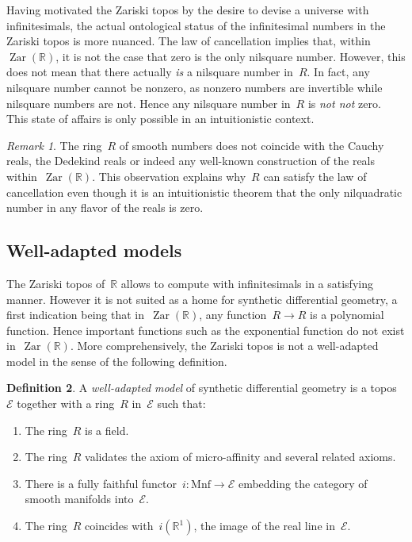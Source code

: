 \documentclass[oneside,reqno]{amsart}
\theoremstyle{definition}
\newtheorem{defn}{Definition}[section]
\theoremstyle{plain}
\theoremstyle{remark}
\newtheorem{rem}[defn]{Remark}
\newcommand{\E}{\mathcal{E}}
\newcommand{\RR}{\mathbb{R}}
\DeclareMathOperator{\Zar}{Zar}
\renewcommand{\_}{\mathpunct{.}\,}
\newcommand{\?}{\,{:}\,}
\begin{document}
Having motivated the Zariski topos by the desire to devise a universe with
infinitesimals, the actual ontological status of the infinitesimal numbers in
the Zariski topos is more nuanced. The law of cancellation implies that,
within~$\Zar(\RR)$, it is not the case that zero is the only nilsquare number.
However, this does not mean that there actually \emph{is} a nilsquare number
in~$R$. In fact, any nilsquare number cannot be nonzero, as nonzero numbers are
invertible while nilsquare numbers are not. Hence any nilsquare number in~$R$
is \emph{not not} zero. This state of affairs is only possible in an
intuitionistic context.

\begin{rem}The ring~$R$ of smooth numbers does not coincide with the Cauchy reals,
the Dedekind reals or indeed any well-known construction of the reals
within~$\Zar(\RR)$. This observation explains why~$R$ can satisfy the law of
cancellation even though it is an intuitionistic theorem that the only
nilquadratic number in any flavor of the reals is zero.
\end{rem}


\subsection{Well-adapted models} The Zariski topos of~$\RR$ allows to compute with
infinitesimals in a satisfying manner. However it is not suited as a home for
synthetic differential geometry, a first indication being that in~$\Zar(\RR)$,
any function~$R \to R$ is a polynomial function. Hence important functions such as the
exponential function do not exist in~$\Zar(\RR)$. More comprehensively, the
Zariski topos is not a well-adapted model in the sense of the following
definition.

\begin{defn}\label{defn:well-adapted}A \emph{well-adapted model} of synthetic
differential geometry is a topos~$\E$ together with a ring~$R$ in~$\E$ such
that:
\begin{enumerate}
\item The ring~$R$ is a field.
\item The ring~$R$ validates the axiom of micro-affinity and several related
axioms.
\item There is a fully faithful functor~$i : \mathrm{Mnf} \to \E$ embedding the
category of smooth manifolds into~$\E$.
\item The ring~$R$ coincides with~$i(\RR^1)$, the image of the real line
in~$\E$.
\end{enumerate}
\end{defn}
\end{document}
